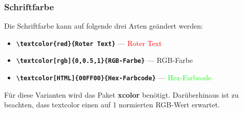 \subsubsection{Schriftfarbe}
Die Schriftfarbe kann auf folgende drei Arten geändert werden:

\begin{itemize}
    \item \textbf{\texttt{\textbackslash textcolor\{red\}\{Roter Text\}}}
          \hspace{2.83cm} --- \hspace{1cm} \textcolor{red}{Roter Text}

    \item \textbf{\texttt{\textbackslash textcolor[rgb]\{0,0.5,1\}\{RGB-Farbe\}}}
          \hspace{1.35cm} --- \hspace{1cm} \textcolor[rgb]{0,0.5,1}{RGB-Farbe}

    \item \textbf{\texttt{\textbackslash textcolor[HTML]\{00FF00\}\{Hex-Farbcode\}}}
          \hspace{0.8cm} --- \hspace{1cm} \textcolor[HTML]{00FF00}{Hex-Farbcode}
\end{itemize}

Für diese Varianten wird das Paket \textbf{xcolor} benötigt. Darüberhinaus ist zu beachten, dass textcolor einen auf 1 normierten RGB-Wert erwartet.


